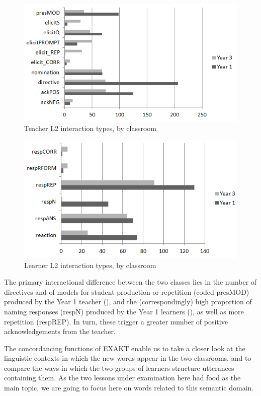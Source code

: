 \documentclass[output=paper,colorlinks,citecolor=brown,modfonts,nonflat]{../langscibook}
\begin{document}
\begin{figure}
\caption{\label{fig:hilton:4}Teacher L2 interaction types, by classroom}
\includegraphics[width=\textwidth]{figures/hilton-img004.png}
 \end{figure}

 \begin{figure}

\caption{\label{fig:hilton:5}Learner L2 interaction types, by classroom}
\includegraphics[width=\textwidth]{figures/hilton-img005.png}
 \end{figure}

The primary interactional difference between the two classes lies in the number of directives and of models for student production or repetition (coded presMOD) produced by the Year 1 teacher (), and the (correspondingly) high proportion of naming responses (respN) produced by the Year 1 learners (), as well as more repetition (respREP). In turn, these trigger a greater number of positive acknowledgements from the teacher.

The concordancing functions of EXAKT enable us to take a closer look at the linguistic contexts in which the new words appear in the two classrooms, and to compare the ways in which the two groups of learners structure utterances containing them. As the two lessons under examination here had food as the main topic, we are going to focus here on words related to this semantic domain.  
\end{document}
